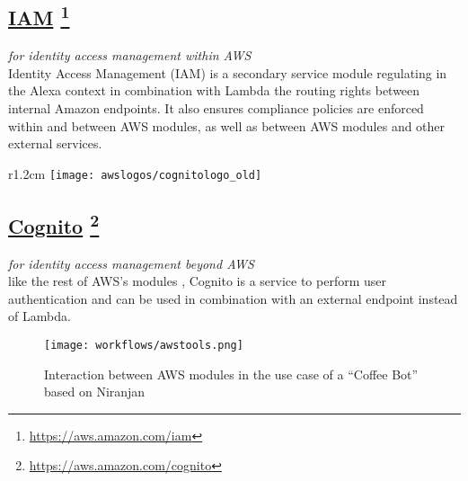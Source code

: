\subsection*{
\href{https://aws.amazon.com/iam/}{\textbf{IAM}} \footnote{\url{https://aws.amazon.com/iam}}
}
	\textit{for identity access management within AWS}\\
	Identity Access Management (IAM) is a secondary service module regulating in the Alexa context in combination with Lambda the routing rights between internal Amazon endpoints. It also ensures compliance policies are enforced within and between AWS modules, as well as between AWS modules and other external services.
%	



\begin{wrapfigure}[2]{r}{1.2cm}
	\texttt{[image: awslogos/cognitologo\_old]}
\end{wrapfigure}


\subsection*{
\href{https://aws.amazon.com/cognito/}{\textbf{Cognito}} \footnote{\url{https://aws.amazon.com/cognito}}
}
	\textit{for identity access management beyond AWS}\\
	like the rest of AWS's modules%
	, Cognito is a %
	service 
	to perform user authentication and can be used in combination with an external endpoint instead of Lambda.\\
	


	

\clearpage


\begin{figure}[h!]
	\caption[Interaction Between AWS Modules (Coffee Bot)]{Interaction between AWS modules in the use case of a ``Coffee Bot'' based on Niranjan \cite{aws:lex_webinar} }\label{lex_interactionExample}
	\centering
	\texttt{[image: workflows/awstools.png]}
\end{figure}
%




